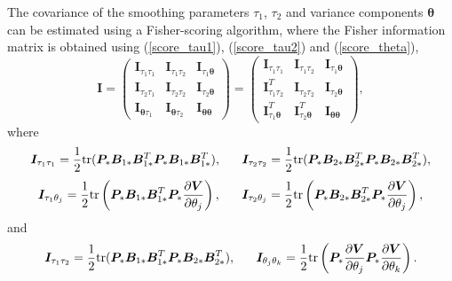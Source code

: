\documentclass[12pt, notitlepage]{article}
\begin{document}
The covariance of the  smoothing parameters $\tau_1$, $\tau_2$ 
and variance components $\boldsymbol \theta$ can be estimated using a Fisher-scoring algorithm, where the Fisher information matrix is obtained using (\ref{score_tau1}), (\ref{score_tau2}) and (\ref{score_theta}), 
$$
\boldsymbol I  = 
 \begin{pmatrix}
  \boldsymbol I _{\tau_1\tau_1} & \boldsymbol I_{\tau_1  \tau_2} & \boldsymbol I_{\tau_1  \boldsymbol\theta} \\
  \boldsymbol I_{\tau_2  \tau_1} & \boldsymbol I_{\tau_2  \tau_2}  & \boldsymbol I_{\tau_2  \boldsymbol\theta} \\
  \boldsymbol I_{\boldsymbol\theta \tau_1} & \boldsymbol I_{ \boldsymbol\theta \tau_2}  & \boldsymbol I_{\boldsymbol\theta  \boldsymbol\theta} 
 \end{pmatrix}
  = 
 \begin{pmatrix}
  \boldsymbol I _{\tau_1\tau_1} & \boldsymbol I_{\tau_1  \tau_2} & \boldsymbol I_{\tau_1  \boldsymbol\theta} \\
 \boldsymbol I_{\tau_1  \tau_2}^T & \boldsymbol I_{\tau_2  \tau_2}  & \boldsymbol I_{\tau_2  \boldsymbol\theta} \\
\boldsymbol I_{\tau_1  \boldsymbol\theta}^T & \boldsymbol I_{\tau_2  \boldsymbol\theta}^T  & \boldsymbol I_{\boldsymbol\theta  \boldsymbol\theta} 
 \end{pmatrix},
$$
where 
$$
\boldsymbol I _{\tau_1\tau_1}  
=
 {1 \over 2}
{\rm tr} (\boldsymbol P_*  \boldsymbol B_{1*} \boldsymbol B_{1*}^T \boldsymbol P_*
 \boldsymbol B_{1*} \boldsymbol B_{1*}^T), 
\quad \ \ 
\boldsymbol I _{\tau_2\tau_2}  
=
 {1 \over 2}
{\rm tr}  (\boldsymbol P_*  \boldsymbol B_{2*} \boldsymbol B_{2*}^T \boldsymbol P_*
 \boldsymbol B_{2*} \boldsymbol B_{2*}^T),
$$
$$
\boldsymbol I _{\tau_1 \theta_j}  
=
{1 \over 2}
{\rm tr} \left(\boldsymbol P_*  \boldsymbol B_{1*} \boldsymbol B_{1*}^T \boldsymbol P_*
{\partial \boldsymbol V  \over \partial \theta_j}\right), 
\quad \ \ 
\boldsymbol I _{\tau_2 \theta_j}  
=
 {1 \over 2}
{\rm tr} \left(\boldsymbol P_*  \boldsymbol B_{2*} \boldsymbol B_{2*}^T \boldsymbol P_*
{\partial \boldsymbol V  \over \partial \theta_j}\right), 
$$
and 
$$
\boldsymbol I _{\tau_1\tau_2}  
=
{1 \over 2}
{\rm tr} (\boldsymbol P_* \boldsymbol B_{1*} \boldsymbol B_{1*}^T
\boldsymbol P_* \boldsymbol B_{2*} \boldsymbol B_{2*}^T), 
\quad \ \ 
\boldsymbol I _{\theta_j \theta_k}  
=
{1 \over 2}
{\rm tr} \left(
\boldsymbol P_* {\partial \boldsymbol V \over \partial \theta_j} \boldsymbol P_*
{\partial \boldsymbol V  \over \partial \theta_k}
\right).
$$
\end{document}
